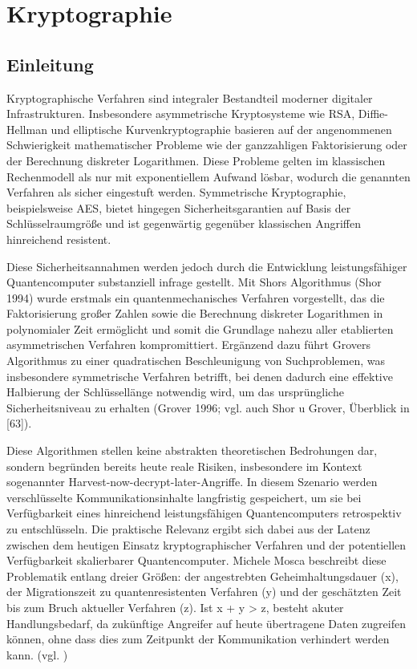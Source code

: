 
\chapter{Kryptographie}



\section{Einleitung}
Kryptographische Verfahren sind integraler Bestandteil moderner digitaler Infrastrukturen. Insbesondere asymmetrische Kryptosysteme wie RSA, Diffie-Hellman und elliptische Kurvenkryptographie basieren auf der angenommenen Schwierigkeit mathematischer Probleme wie der ganzzahligen Faktorisierung oder der Berechnung diskreter Logarithmen. Diese Probleme gelten im klassischen Rechenmodell als nur mit exponentiellem Aufwand lösbar, wodurch die genannten Verfahren als sicher eingestuft werden. Symmetrische Kryptographie, beispielsweise AES, bietet hingegen Sicherheitsgarantien auf Basis der Schlüsselraumgröße und ist gegenwärtig gegenüber klassischen Angriffen hinreichend resistent.

Diese Sicherheitsannahmen werden jedoch durch die Entwicklung leistungsfähiger Quantencomputer substanziell infrage gestellt. Mit Shors Algorithmus (Shor 1994) wurde erstmals ein quantenmechanisches Verfahren vorgestellt, das die Faktorisierung großer Zahlen sowie die Berechnung diskreter Logarithmen in polynomialer Zeit ermöglicht und somit die Grundlage nahezu aller etablierten asymmetrischen Verfahren kompromittiert. Ergänzend dazu führt Grovers Algorithmus zu einer quadratischen Beschleunigung von Suchproblemen, was insbesondere symmetrische Verfahren betrifft, bei denen dadurch eine effektive Halbierung der Schlüssellänge notwendig wird, um das ursprüngliche Sicherheitsniveau zu erhalten (Grover 1996; vgl. auch Shor u Grover, Überblick in [63]).

Diese Algorithmen stellen keine abstrakten theoretischen Bedrohungen dar, sondern begründen bereits heute reale Risiken, insbesondere im Kontext sogenannter Harvest-now-decrypt-later-Angriffe. In diesem Szenario werden verschlüsselte Kommunikationsinhalte langfristig gespeichert, um sie bei Verfügbarkeit eines hinreichend leistungsfähigen Quantencomputers retrospektiv zu entschlüsseln. Die praktische Relevanz ergibt sich dabei aus der Latenz zwischen dem heutigen Einsatz kryptographischer Verfahren und der potentiellen Verfügbarkeit skalierbarer Quantencomputer. Michele Mosca beschreibt diese Problematik entlang dreier Größen: der angestrebten Geheimhaltungsdauer (x), der Migrationszeit zu quantenresistenten Verfahren (y) und der geschätzten Zeit bis zum Bruch aktueller Verfahren (z). Ist x + y > z, besteht akuter Handlungsbedarf, da zukünftige Angreifer auf heute übertragene Daten zugreifen können, ohne dass dies zum Zeitpunkt der Kommunikation verhindert werden kann. (vgl. \cite{mosca_et_al_cybersecurity_2018})


